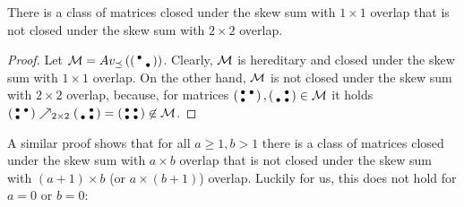
\begin{obs}
There is a class of matrices closed under the skew sum with $1\times1$ overlap that is not closed under the skew sum with $2\times2$ overlap.
\end{obs}
\begin{proof}
Let $\mathcal{M}=Av_{\preceq}\left(\left(\begin{smallmatrix}\bullet& \\ &\bullet\end{smallmatrix}\right)\right)$. Clearly, $\mathcal{M}$ is hereditary and closed under the skew sum with $1\times1$ overlap. On the other hand, $\mathcal{M}$ is not closed under the skew sum with $2\times2$ overlap, because, for matrices $\left(\begin{smallmatrix}\bullet&\bullet\\\bullet& \end{smallmatrix}\right),\left(\begin{smallmatrix} &\bullet\\\bullet&\bullet\end{smallmatrix}\right)\in\mathcal{M}$ it holds $\left(\begin{smallmatrix}\bullet&\bullet\\\bullet& \end{smallmatrix}\right)\nearrow_{2\times2}\left(\begin{smallmatrix} &\bullet\\\bullet&\bullet\end{smallmatrix}\right)=\left(\begin{smallmatrix}\bullet&\bullet\\\bullet&\bullet\end{smallmatrix}\right)\not\in\mathcal{M}$.
\end{proof}

A similar proof shows that for all $a\geq1,b>1$ there is a class of matrices closed under the skew sum with $a\times b$ overlap that is not closed under the skew sum with $(a+1)\times b$ (or $a\times(b+1)$) overlap. Luckily for us, this does not hold for $a=0$ or $b=0$:

